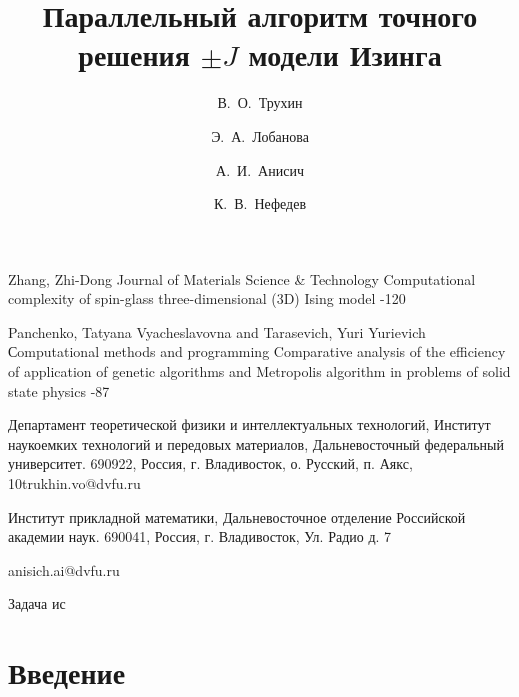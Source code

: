 \documentclass[10pt]{article}
\begin{document}
{\begin{thebibliography}{4}
			\by Zhang, Zhi-Dong
			\jour Journal of Materials Science \& Technology
			\paper Computational complexity of spin-glass three-dimensional (3D) Ising model
			-120
			
			\by Panchenko, Tatyana Vyacheslavovna and Tarasevich, Yuri Yurievich
			\jour Сomputational methods and programming
			\paper Comparative analysis of the efficiency of application of genetic algorithms and Metropolis algorithm in problems of solid state physics
			-87
			
		\end{thebibliography}
	}
	
	
	
	
	\title{Параллельный алгоритм точного решения $\pm J$ модели Изинга}
	
	\author[1,2]{В.\, О.~Трухин}{Департамент теоретической физики и интеллектуальных технологий, Институт наукоемких технологий и передовых материалов, Дальневосточный федеральный университет. 690922, Россия, г. Владивосток, о. Русский, п. Аякс, 10}{trukhin.vo@dvfu.ru}
	\author[1,2]{Э.\, А.~Лобанова}{Институт прикладной математики, Дальневосточное отделение Российской академии наук. 690041, Россия, г. Владивосток, Ул. Радио д. 7}{}
	\author[1]{А.\, И.~Анисич}{}{anisich.ai@dvfu.ru}
	\author[1,2]{К.\, В.~Нефедев}{}{}
	
	
	
	
	\makeface
	
	
	
	\abstract Задача ис
	
	
	
	\section*{Введение}
	
\end{document}
